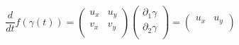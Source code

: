 \documentclass{homework}
\begin{document}
\begin{solution}
                                                                                                                                                                                          \[\frac{d}{dt} f(\gamma(t)) = 
                                                                                                                                                                                          \begin{pmatrix}
                                                                                                                                                                                          u_x & u_y\\
                                                                                                                                                                                          v_x & v_y\\
                                                                                                                                                                                          \end{pmatrix}
                                                                                                                                                                                          \begin{pmatrix}
                                                                                                                                                                                          \partial_1\gamma\\
                                                                                                                                                                                          \partial_2\gamma\\
                                                                                                                                                                                          \end{pmatrix}
                                                                                                                                                                                          = 
                                                                                                                                                                                          \begin{pmatrix}
                                                                                                                                                                                          u_x & u_y\\\

\end{pmatrix}\]
\end{solution}
\end{document}
